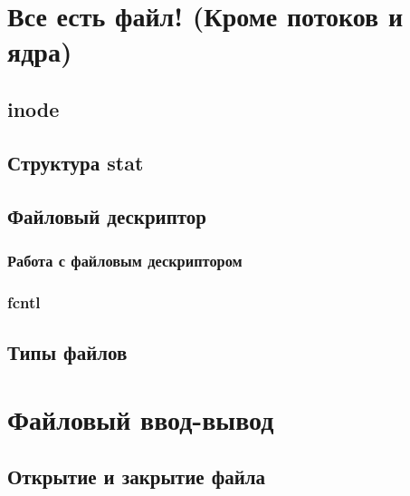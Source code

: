 \documentclass[oneside]{book}
\begin{document}
	\chapter{Все есть файл! (Кроме потоков и ядра)}
	
	
		\section{inode}
		
		
			\section{Структура stat}
			
			
		\section{Файловый дескриптор}
		
			
			\subsection{Работа с файловым дескриптором}
			
			
			\subsection{fcntl}
			
	
		\section{Типы файлов}
		
		
	\chapter{Файловый ввод-вывод}
	
	
		\section{Открытие и закрытие файла}
		
		
\end{document}
